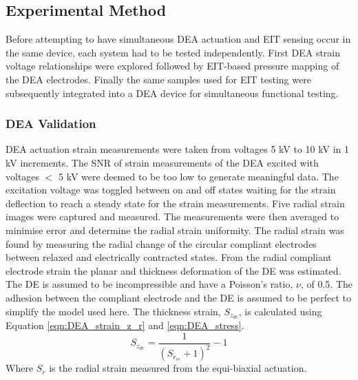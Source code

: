 \subsection{Experimental Method}
\label{subsec:experimental_method}
Before attempting to have simultaneous DEA actuation and EIT sensing occur in the same device, each system had to be tested independently. First DEA strain voltage relationships were explored followed by EIT-based pressure mapping of the DEA electrodes. Finally the same samples used for EIT testing were subsequently integrated into a DEA device for simultaneous functional testing.

\subsubsection{DEA Validation} %
\label{subsubsec:dea_validation1}
DEA actuation strain measurements were taken from voltages 5 kV to 10 kV in 1 kV increments. The SNR of strain measurements of the DEA excited with voltages $<$ 5 kV were deemed to be too low to generate meaningful data. The excitation voltage was toggled between on and off states waiting for the strain deflection to reach a steady state for the strain measurements. Five radial strain images were captured and measured. The measurements were then averaged to minimise error and determine the radial strain uniformity. The radial strain was found by measuring the radial change of the circular compliant electrodes between relaxed and electrically contracted states. From the radial compliant electrode strain the planar and thickness deformation of the DE was estimated. The DE is assumed to be incompressible and have a Poisson's ratio, $\nu$, of 0.5. The adhesion between the compliant electrode and the DE is assumed to be perfect to simplify the model used here. The thickness strain, $S_{z_{de}}$, is calculated using Equation \ref{eqn:DEA_strain_z_r} \cite{Carpi2015} and \ref{eqn:DEA_stress}.
\begin{equation}
	S_{z_{de}} = \frac{1}{(S_{r_{ce}} + 1)^2} - 1
	\label{eqn:DEA_strain_z_r}
\end{equation}
Where $S_r$ is the radial strain measured from the equi-biaxial actuation. 
